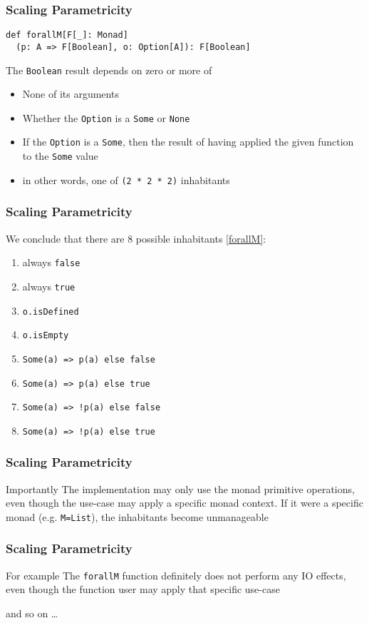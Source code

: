 \begin{frame}[fragile]
\frametitle{Scaling Parametricity}
\begin{lstlisting}[style=scala]
def forallM[F[_]: Monad]
  (p: A => F[Boolean], o: Option[A]): F[Boolean]
\end{lstlisting}
\begin{theorem}
  The \lstinline{Boolean} result depends on zero or more of
  \begin{itemize}
    \item None of its arguments
    \item Whether the \lstinline{Option} is a \lstinline{Some} or \lstinline{None}
    \item If the \lstinline{Option} is a \lstinline{Some}, then the result of having applied the given function to the \lstinline{Some} value
    \item in other words, one of \lstinline{(2 * 2 * 2)} inhabitants
  \end{itemize}
\end{theorem}
\end{frame}

\begin{frame}[fragile]
\frametitle{Scaling Parametricity}
  We conclude that there are 8 possible inhabitants \ref{forallM}:
  \begin{enumerate}
    \item always \lstinline{false}
    \item always \lstinline{true}
    \item \lstinline{o.isDefined}
    \item \lstinline{o.isEmpty}
    \item \lstinline{Some(a) => p(a) else false}
    \item \lstinline{Some(a) => p(a) else true}
    \item \lstinline{Some(a) => !p(a) else false}
    \item \lstinline{Some(a) => !p(a) else true}
  \end{enumerate}
\end{frame}

\begin{frame}[fragile]
\frametitle{Scaling Parametricity}
  \begin{block}{Importantly}
  The implementation may only use the monad primitive operations, even though the use-case may apply a specific monad context. If it were a specific monad (e.g. \lstinline{M=List}), the inhabitants become unmanageable
  \end{block}
\end{frame}

\begin{frame}[fragile]
\frametitle{Scaling Parametricity}
  \begin{block}{For example}
  The \lstinline{forallM} function definitely does not perform any IO effects, even though the function user may apply that specific use-case
  \end{block}
  and so on \ldots
\end{frame}
